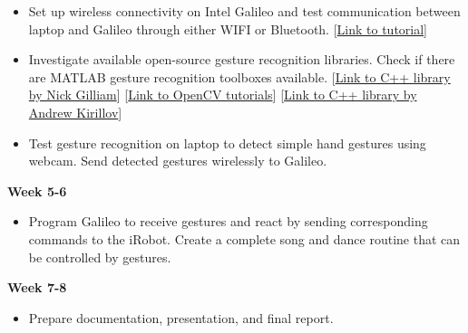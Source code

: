 \documentclass[11pt]{article} %
\begin{document}
\begin{itemize}
\item Set up wireless connectivity on Intel Galileo and test communication between laptop and Galileo through either WIFI or Bluetooth. [\href{http://ionospherics.com/intel-galileo-setting-up-wifi/}{Link to tutorial}]

\item Investigate available open-source gesture recognition libraries. Check if there are MATLAB gesture recognition toolboxes available.
[\href{http://www.nickgillian.com/software/grt}{Link to C++ library by Nick Gilliam}]
[\href{http://www.intorobotics.com/9-opencv-tutorials-hand-gesture-detection-recognition/}{Link to OpenCV tutorials}]
[\href{http://www.codeproject.com/Articles/26280/Hands-Gesture-Recognition}{Link to C++ library by Andrew Kirillov}]

\item Test gesture recognition on laptop to detect simple hand gestures using webcam. Send detected gestures wirelessly to Galileo.
\end{itemize}
\textbf{Week 5-6}
\begin{itemize}
\item Program Galileo to receive gestures and react by sending corresponding commands to the iRobot. Create a complete song and dance routine that can be controlled by gestures.
\end{itemize}
\textbf{Week 7-8}
\begin{itemize}
\item Prepare documentation, presentation, and final report.


\end{itemize}
\end{document}
